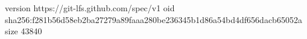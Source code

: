 version https://git-lfs.github.com/spec/v1
oid sha256:f281b56d58eb2ba27279a89faaa280be236345b1d86a54bd4df656dacb65052a
size 43840
